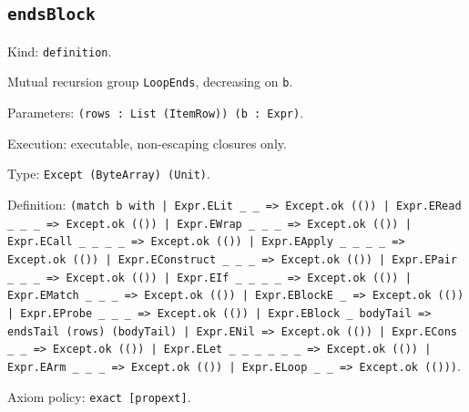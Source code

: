 \documentclass[11pt]{article}
\begin{document}
\subsection*{\texttt{endsBlock}}
\noindent Kind: \texttt{definition}.\par
\noindent Mutual recursion group \texttt{LoopEnds}, decreasing on \texttt{b}.\par
\noindent Parameters: \texttt{(rows : List (ItemRow)) (b : Expr)}.\par
\noindent Execution: executable, non-escaping closures only.\par
\noindent Type: \texttt{Except (ByteArray) (Unit)}.\par
\noindent Definition: \texttt{(match b with | Expr.ELit \_ \_ => Except.ok (()) | Expr.ERead \_ \_ \_ => Except.ok (()) | Expr.EWrap \_ \_ \_ => Except.ok (()) | Expr.ECall \_ \_ \_ \_ => Except.ok (()) | Expr.EApply \_ \_ \_ \_ => Except.ok (()) | Expr.EConstruct \_ \_ \_ => Except.ok (()) | Expr.EPair \_ \_ \_ => Except.ok (()) | Expr.EIf \_ \_ \_ \_ => Except.ok (()) | Expr.EMatch \_ \_ \_ => Except.ok (()) | Expr.EBlockE \_ => Except.ok (()) | Expr.EProbe \_ \_ \_ => Except.ok (()) | Expr.EBlock \_ bodyTail => endsTail (rows) (bodyTail) | Expr.ENil => Except.ok (()) | Expr.ECons \_ \_ => Except.ok (()) | Expr.ELet \_ \_ \_ \_ \_ \_ => Except.ok (()) | Expr.EArm \_ \_ \_ => Except.ok (()) | Expr.ELoop \_ \_ => Except.ok (()))}.\par
\noindent Axiom policy: \texttt{exact [propext]}.\par
\end{document}
